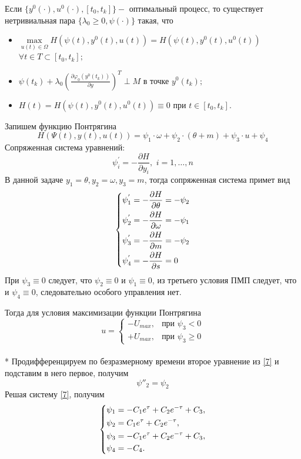\documentclass[a4paper,14pt]{article}
\theoremstyle{plain} %
\theoremstyle{definition} %
\theoremstyle{remark} %
\begin{document}
{Если $\{y^0(\cdot),u^0(\cdot),[t_0,t_k]\} - $ оптимальный процесс, то существует нетривиальная пара $\{\lambda_0\geq0,\psi(\cdot)\}$
такая, что
\begin{itemize}
    \item $ \mathop {\max }\limits_{u(t) \in \Omega}  H(\psi(t),y^0(t),u(t))=H(\psi(t),y^0(t),u^0(t))$
          $\forall t \in T \subset [t_0,t_k];$
    \item $\psi(t_k)+\lambda_0(\frac{\partial \varphi_0(y^0(t_k))}{\partial y})^T \perp M \text{ в точке } y^0(t_k);$
    \item $H(t)=H(\psi(t),y^0(t),u^0(t))\equiv0 \text{ при } t \in [t_0,t_k].$
\end{itemize}
Запишем функцию Понтрягина
\[
    H(\Psi(t),y(t),u(t))=\psi_1\cdot\omega+\psi_2\cdot(\theta+m)+\psi_3\cdot u+\psi_4
\]
Сопряженная система уравнений:
\[
    \psi^{'}_i  =  - \frac{{\partial H}}{{\partial y_i }},\,\,i = 1, \ldots ,n
\]
В данной задаче $y_1 = \theta, y_2 = \omega, y_3=m$, тогда сопряженная система примет вид
\begin{equation} \label{7}
    \left\{ {\begin{aligned}
                 & \psi^{'}_1=  - \frac{{\partial H}}{{\partial \theta}} = - \psi_2\hfill  \\
                 & \psi^{'}_2=  - \frac{{\partial H}}{{\partial \omega }} = - \psi_1\hfill \\
                 & \psi^{'}_3=  - \frac{{\partial H}}{{\partial m }} = - \psi_2 \hfill     \\
                 & \psi^{'}_4=- \frac{{\partial H}}{{\partial s }}= 0 \hfill               \\
            \end{aligned}} \right.
\end{equation}
При $\psi_3\equiv0$ следует, что $\psi_2\equiv0$ и $\psi_1\equiv0$, из третьего условия ПМП следует, что и $\psi_4\equiv0$, следовательно особого управления нет.

Тогда для условия максимизации функции Понтрягина
\[
    u=
    \begin{cases}
        -U_{max}, & \text{при $\psi_3<0$}    \\
        +U_{max}, & \text{при $\psi_3\geq0$}
    \end{cases}
\]\\*
Продифференцируем по безразмерному времени второе уравнение из \eqref{7} и подставим в него первое, получим
\[
    \psi{''}_2=\psi_2
\]
Решая систему \eqref{7}, получим
\begin{equation}\label{psisystem}
    \left\{ {\begin{aligned}
                 & \psi_1 = -C_1e^\tau+C_2e^{-\tau}+C_3, \hfill  \\
                 & \psi_2 = C_1e^\tau+C_2e^{-\tau} , \hfill      \\
                 & \psi_3 = -C_1e^\tau+C_2e^{-\tau}+C_3 , \hfill \\
                 & \psi_4 = -C_4 . \hfill                        \\
            \end{aligned}} \right.
\end{equation}

}
\end{document}
